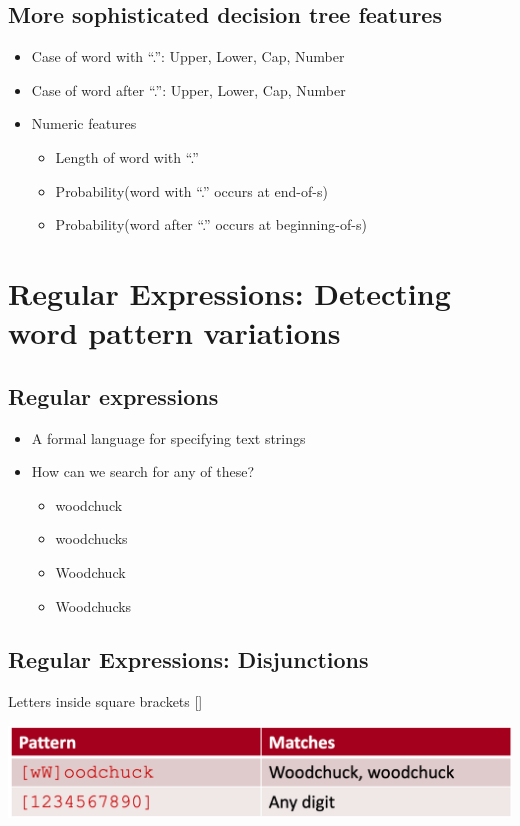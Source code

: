 \documentclass[11pt]{article}
\theoremstyle{definition}
\begin{document}
\subsection{More sophisticated decision tree features}
\begin{itemize}
  \item Case of word with “.”: Upper, Lower, Cap, Number
  \item Case of word after “.”: Upper, Lower, Cap, Number
  \item Numeric features
  \begin{itemize}
    \item Length of word with “.”
    \item Probability(word with “.” occurs at end-of-s)
    \item Probability(word after “.” occurs at beginning-of-s)
  \end{itemize}
\end{itemize}

\section{Regular
Expressions:
Detecting word
pattern variations}
\subsection{Regular expressions}
\begin{itemize}
  \item A formal language for specifying text strings
  \item How can we search for any of these?
  \begin{itemize}
    \item woodchuck
    \item woodchucks
    \item Woodchuck
    \item Woodchucks
  \end{itemize}
\end{itemize}

\subsection{Regular Expressions: Disjunctions}
Letters inside square brackets []

\includegraphics[width=\textwidth]{7.png}
\end{document}
